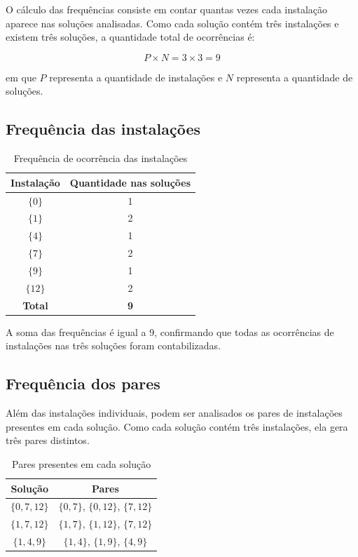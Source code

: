 \documentclass[12pt,a4paper]{article}
\begin{document}
O cálculo das frequências consiste em contar quantas
vezes cada instalação aparece nas soluções analisadas.
Como cada solução contém três instalações e existem
três soluções, a quantidade total de ocorrências é:

\[
P \times N = 3 \times 3 = 9
\]

em que $P$ representa a quantidade de instalações e $N$ representa a quantidade de soluções.

\subsection{Frequência das instalações}

\begin{table}[H]
\centering
\caption{Frequência de ocorrência das instalações}
\begin{tabular}{cc}
\toprule
\textbf{Instalação} & \textbf{Quantidade nas soluções} \\
\midrule
$\{0\}$  & 1 \\
$\{1\}$  & 2 \\
$\{4\}$  & 1 \\
$\{7\}$  & 2 \\
$\{9\}$  & 1 \\
$\{12\}$ & 2 \\
\midrule
\textbf{Total} & \textbf{9} \\
\bottomrule
\end{tabular}
\end{table}

A soma das frequências é igual a 9, confirmando que
todas as ocorrências de instalações nas três soluções
foram contabilizadas.

\subsection{Frequência dos pares}

Além das instalações individuais, podem ser analisados
os pares de instalações presentes em cada solução.
Como cada solução contém três instalações, ela gera
três pares distintos.

\begin{table}[H]
\centering
\caption{Pares presentes em cada solução}
\begin{tabular}{cc}
\toprule
\textbf{Solução} & \textbf{Pares} \\
\midrule
$\{0,7,12\}$ &
$\{0,7\}$, $\{0,12\}$, $\{7,12\}$ \\
$\{1,7,12\}$ &
$\{1,7\}$, $\{1,12\}$, $\{7,12\}$ \\
$\{1,4,9\}$ &
$\{1,4\}$, $\{1,9\}$, $\{4,9\}$ \\
\bottomrule
\end{tabular}
\end{table}
\end{document}
